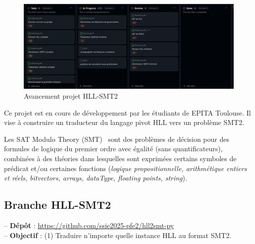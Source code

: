 \documentclass{article}
\begin{document}
\begin{figure}[h]
\hspace{-1cm}
    \includegraphics[scale=0.14]{avancement_pfe.png}
    \caption{Avancement projet HLL-SMT2}
    \label{fig:avancement}
\end{figure}

Ce projet est en cours de développement par les étudiants de EPITA Toulouse. Il vise à construire un traducteur du langage pivot HLL vers un problème SMT2.

Les SAT Modulo Theory (SMT)~\cite{BarFT-SMTLIB} sont des problèmes de décision pour des formules de logique du premier ordre avec égalité (sans quantificateurs), combinées à des théories dans lesquelles sont exprimées certains symboles de prédicat et/ou certaines fonctions (\textit{logique propositionnelle, arithmétique entiers et réels, bitvectors, arrays, dataType, floating points, string}).




\subsection{Branche HLL-SMT2}

\hspace{0.5cm}-- \textbf{Dépôt} : \url{https://github.com/ssie2025-pfe2/hll2smt-py}\\


-- \textbf{Objectif} : (1) Traduire n'importe quelle instance HLL au format SMT2.
\end{document}
